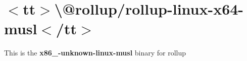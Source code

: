 \chapter{\texorpdfstring{$<$}{<}tt\texorpdfstring{$>$}{>}\textbackslash{}@rollup/rollup-\/linux-\/x64-\/musl\texorpdfstring{$<$}{<}/tt\texorpdfstring{$>$}{>}}
\hypertarget{md__2home_2solype_2delivery_2current__days_2trello_2front_2node__modules_2_0drollup_2rollup-linux-x64-musl_2README}{}\label{md__2home_2solype_2delivery_2current__days_2trello_2front_2node__modules_2_0drollup_2rollup-linux-x64-musl_2README}
\label{md__2home_2solype_2delivery_2current__days_2trello_2front_2node__modules_2_0drollup_2rollup-linux-x64-musl_2README_autotoc_md8303}%
%
 This is the {\bfseries{x86\+\_-\/unknown-\/linux-\/musl}} binary for {\ttfamily rollup} 